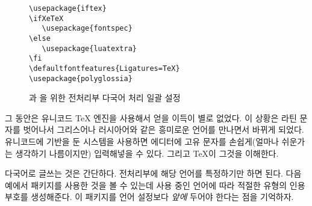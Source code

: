 \begin{figure}[!tp]
\begin{lined}{10cm}
\begin{verbatim}
\usepackage{iftex}
\ifXeTeX
   \usepackage{fontspec}
\else
   \usepackage{luatextra}
\fi
\defaultfontfeatures{Ligatures=TeX}
\usepackage{polyglossia}
\end{verbatim}
\end{lined}
\caption[전처리부의 설정]{과 을 위한 전처리부 다국어 처리 일괄 설정} \label{allinone}
\end{figure}

그 동안은 유니코드 \TeX{} 엔진을 사용해서 얻을 이득이 별로 없었다. 이 상황은 라틴 문자를 벗어나서 
그리스어나 러시아어와 같은 흥미로운 언어를 만나면서 바뀌게 되었다.
유니코드에 기반을 둔 시스템을 사용하면 에디터에 고유 문자를 손쉽게(얼마나 쉬운가는 생각하기 나름이지만)
입력해넣을 수 있다. 그리고 \TeX 이 그것을 이해한다.

다국어로 글쓰는 것은 간단하다. 전처리부에 해당 언어를 특정하기만 하면 된다. 다음 예에서  패키지를
사용한 것을 볼 수 있는데 사용 중인 언어에 따라 적절한 유형의 인용부호를 생성해준다.
이 패키지를 언어 설정보다 \emph{앞에} 두어야 한다는 점을 기억하자.

